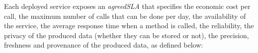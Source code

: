 
\begin{figure}
\end{figure}


Each deployed service exposes an \textit{agreedSLA} that specifies the economic cost per call, the maximum number of calls that can be done per day, the availability of the service, the average response time when a method is called, the reliability, the privacy of the produced data (whether they can be stored or not), the precision, freshness and provenance of the produced data, as defined below:

